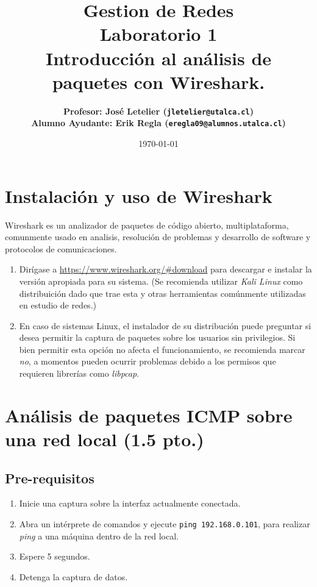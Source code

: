 \documentclass[11pt]{utalcaDoc}
\title{{\bf Gestion de Redes}\\Laboratorio 1\\Introducción al análisis de paquetes con Wireshark.}
\author{
    \bf{Profesor:} José Letelier (\texttt{jletelier@utalca.cl})\\ 
    \bf{Alumno Ayudante:} Erik Regla (\texttt{eregla09@alumnos.utalca.cl})\\ }
\date{\today}
\begin{document}
\renewcommand{\figurename}{Figura~}
\renewcommand{\tablename}{Tabla~}

\maketitle

\section{Instalación y uso de Wireshark}
Wireshark es un analizador de paquetes de código abierto, multiplataforma, 
comunmente usado en analisis, resolución de problemas y desarrollo de 
software y protocolos de comunicaciones.
\begin{enumerate}
    \item Dirígase a \url{https://www.wireshark.org/#download} para descargar 
    e instalar la versión apropiada para su sistema. (Se recomienda utilizar 
    \emph{Kali Linux} como distribuición dado que trae esta y otras herramientas
    comúnmente utilizadas en estudio de redes.)
    \item En caso de sistemas Linux, el instalador de su distribución puede preguntar
    si desea permitir la captura de paquetes sobre los usuarios sin privilegios.
    Si bien permitir esta opción no afecta el funcionamiento, se recomienda marcar
    \emph{no}, a momentos pueden ocurrir problemas debido a los permisos que requieren
    librerías como \emph{libpcap}.
\end{enumerate}

\section{Análisis de paquetes ICMP sobre una red local (1.5 pto.)}
\subsection{Pre-requisitos}
\begin{enumerate}
    \item{ Inicie una captura sobre la interfaz actualmente conectada. }
    \item{ Abra un intérprete de comandos y ejecute \texttt{ping 192.168.0.101},
    para realizar \emph{ping} a una máquina dentro de la red local. }
    \item{ Espere 5 segundos. }
    \item{ Detenga la captura de datos. }
\end{enumerate}
\end{document}
